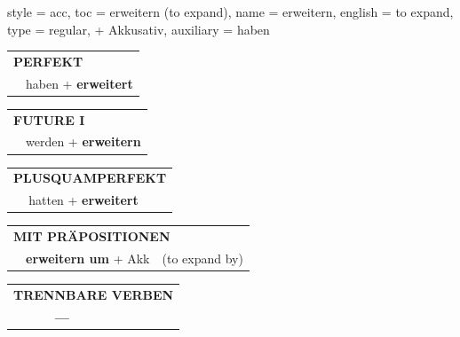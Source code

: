 \begin{verbentry}{
  style = {acc},
  toc = {erweitern (to expand)},
  name = {erweitern},
  english = {to expand},
  type = {regular, + Akkusativ},
  auxiliary = {haben}
}
\vspace{10pt}

\begin{tabular}{rl}
\multicolumn{2}{l}{\textbf{PERFEKT}}\\
& haben + \textbf{erweitert}\\
\end{tabular}
\hfill
\begin{tabular}{rl}
\multicolumn{2}{l}{\textbf{FUTURE I}}\\
& werden + \textbf{erweitern}\\
\end{tabular}
\hfill
\begin{tabular}{rl}
\multicolumn{2}{l}{\textbf{PLUSQUAMPERFEKT}}\\
& hatten + \textbf{erweitert}\\
\end{tabular}

\vspace{10pt}

\begin{tabular}{lll}
\multicolumn{3}{l}{\textbf{MIT PRÄPOSITIONEN}}\\
& \textbf{erweitern um} + Akk & (to expand by)\\
\end{tabular}
\hfill
\begin{tabular}{lll}
\multicolumn{3}{l}{\textbf{TRENNBARE VERBEN}}\\
& \textbf{---} & \\
\end{tabular}

\vspace{-5pt}
\end{verbentry}

